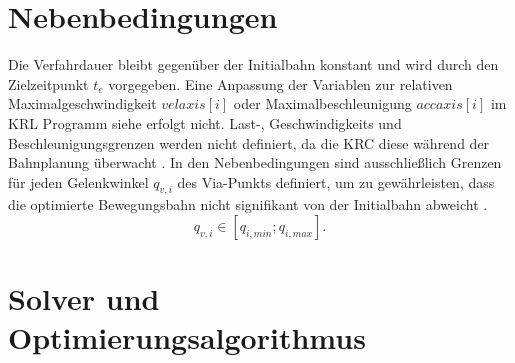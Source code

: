 \section{Nebenbedingungen}
Die Verfahrdauer bleibt gegenüber der Initialbahn konstant und wird durch den Zielzeitpunkt $t_e$ vorgegeben. Eine Anpassung der Variablen zur relativen Maximalgeschwindigkeit $vel axis[i]$ oder Maximalbeschleunigung $acc axis[i]$ im KRL Programm siehe \cite[S.~532]{Ziaukas.2017} erfolgt nicht. Last-, Geschwindigkeits und Beschleunigungsgrenzen werden nicht definiert, da die KRC diese während der Bahnplanung überwacht \cite[S.~57]{Eggers.2019}. In den Nebenbedingungen sind ausschließlich Grenzen für jeden Gelenkwinkel $q_{v,i}$ des Via-Punkts definiert, um zu gewährleisten, dass die optimierte Bewegungsbahn nicht signifikant von der Initialbahn abweicht \cite[S.~5]{Hansen.2012}.
\begin{equation}
	q_{v,i} \in [q_{i,min};q_{i,max}].
\end{equation}
%
\section{Solver und Optimierungsalgorithmus}